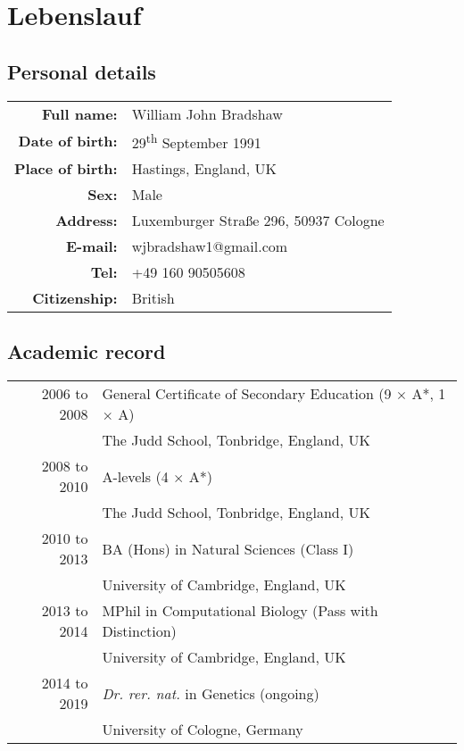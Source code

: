 
\cleardoublepage
\setsinglecolumn
\chapter*{\centering \LARGE Lebenslauf}
\pagestyle{empty}

\section*{Personal details}
\begin{tabular}{>{\bfseries}rl}
Full name: & William John Bradshaw\\
Date of birth: & 29\textsuperscript{th} September 1991\\
Place of birth: & Hastings, England, UK\\
Sex: & Male\\
Address: & Luxemburger Stra\ss{}e 296, 50937 Cologne\\
E-mail: & wjbradshaw1@gmail.com\\
Tel: & +49 160 90505608\\
Citizenship: & British
\end{tabular}

\section*{Academic record}
\begin{tabular}{rl}
2006 to 2008 & General Certificate of Secondary Education (9 $\times$ A*, 1 $\times$ A)\\
& The Judd School, Tonbridge, England, UK\\
2008 to 2010 & A-levels (4 $\times$ A*)\\
& The Judd School, Tonbridge, England, UK\\
2010 to 2013 & BA (Hons) in Natural Sciences (Class I)\\
& University of Cambridge, England, UK\\
2013 to 2014 & MPhil in Computational Biology (Pass with Distinction)\\
& University of Cambridge, England, UK\\
2014 to 2019 & \textit{Dr. rer. nat.} in Genetics (ongoing)\\
& University of Cologne, Germany
\end{tabular}
